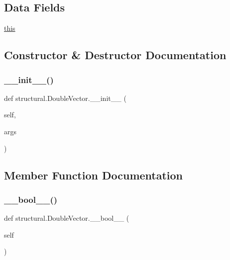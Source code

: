\subsection*{Data Fields}
\begin{DoxyCompactItemize}
\item 
\hyperlink{classstructural_1_1_double_vector_a3475f392b11340f70dfb544af8375277}{this}
\end{DoxyCompactItemize}


\subsection{Constructor \& Destructor Documentation}
\mbox{\label{classstructural_1_1_double_vector_a20b69fa4a1e554c5fffff3d1dabbb3d6}} 
\subsubsection{\texorpdfstring{\+\_\+\+\_\+init\+\_\+\+\_\+()}{\_\_init\_\_()}}
{\footnotesize\ttfamily def structural.\+Double\+Vector.\+\_\+\+\_\+init\+\_\+\+\_\+ (\begin{DoxyParamCaption}\item[{}]{self,  }\item[{}]{args }\end{DoxyParamCaption})}



\subsection{Member Function Documentation}
\mbox{\label{classstructural_1_1_double_vector_a96689ff5e56c53c0dca26a8708a007b4}} 
\subsubsection{\texorpdfstring{\+\_\+\+\_\+bool\+\_\+\+\_\+()}{\_\_bool\_\_()}}
{\footnotesize\ttfamily def structural.\+Double\+Vector.\+\_\+\+\_\+bool\+\_\+\+\_\+ (\begin{DoxyParamCaption}\item[{}]{self }\end{DoxyParamCaption})}

